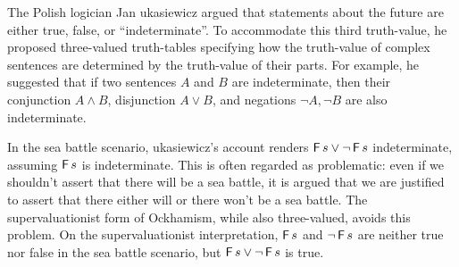 The Polish logician Jan \polishL{}ukasiewicz argued that statements about the
future are either true, false, or ``indeterminate''. To accommodate this third
truth-value, he proposed three-valued truth-tables specifying how the
truth-value of complex sentences are determined by the truth-value of their
parts. For example, he suggested that if two sentences $A$ and $B$ are
indeterminate, then their conjunction $A \land B$, disjunction $A \lor B$, and
negations $\neg A, \neg B$ are also indeterminate.

In the sea battle scenario, \polishL{}ukasiewicz's account renders
$\operatorname{\mathsf{F}} s \lor \neg \operatorname{\mathsf{F}} s$ indeterminate, assuming $\operatorname{\mathsf{F}} s$ is indeterminate. This
is often regarded as problematic: even if we shouldn't assert that there will be
a sea battle, it is argued that we are justified to assert that there either
will or there won't be a sea battle. The supervaluationist form of Ockhamism,
while also three-valued, avoids this problem. On the supervaluationist
interpretation, $\operatorname{\mathsf{F}} s$ and $\neg \operatorname{\mathsf{F}} s$ are neither true nor false in the sea
battle scenario, but $\operatorname{\mathsf{F}} s \lor \neg \operatorname{\mathsf{F}} s$ is true.

